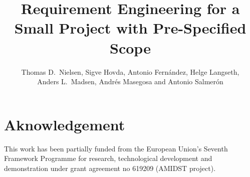 \documentclass[ukenglish]{nik}
\title{Requirement Engineering for a Small Project with Pre-Specified Scope}
\author{Thomas D.\ Nielsen, Sigve Hovda, Antonio Fern\'andez, Helge Langseth, \\
Anders L.\ Madsen, Andr\'es Masegosa and  Antonio Salmer\'on }
\begin{document}
\maketitle

\begin{abstract}

\end{abstract}











\section*{Aknowledgement}
This work has been partially funded from the European Union's Seventh Framework Programme for research, technological development and demonstration under grant agreement no 619209 (AMIDST project).  



\end{document}
